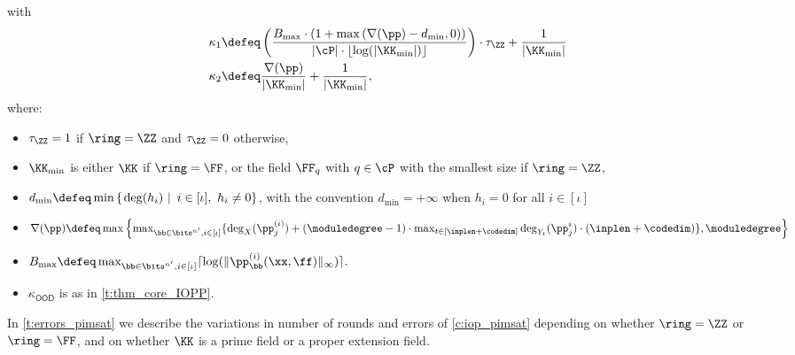 \begin{theorem}
$$    $$
    with 
    \begin{align*}
    \kappa_1 &\defeq  \left(\frac{B_{\max}\cdot \left(1+\max\left(\nabla(\pp) - d_{\min},0\right)\right)}{|\cP|\cdot \lfloor\log(|\KK_{\min}|)\rfloor}\right)\cdot \tau_{\ZZ} + \frac{1}{|\KK_{\min}|} \\
    \kappa_2 &\defeq \frac{\nabla(\pp)}{|\KK_{\min}|} + \frac{1}{|\KK_{\min}|},
    \end{align*}
    where:
    \begin{itemize}
        \item $\tau_{\ZZ}=1$ if $\ring=\ZZ$ and $\tau_\ZZ=0$ otherwise,
        \item $\KK_{\min}$ is either $\KK$ if $\ring=\FF$, or  the field $\FF_q$ with $q\in \cP$ with the smallest size if $\ring=\ZZ$,
        \item $d_{\min} \defeq \min\left\{\left.\deg(h_i) \ \right| \ i\in [\iota], \ h_i\neq 0\right\}$, with the convention $d_{\min}=+\infty$ when $h_i=0$ for all $i\in [\iota]$
        \item $\nabla(\pp)\defeq \max\left\{\max_{\bb\in \bits^{n'}, i\in[\iota]}\{\deg_X(\pp_{j}^{(i)}) + (\moduledegree-1)\cdot \max_{t\in [\inplen+\codedim\textit{}]}\deg_{Y_t}(\pp_j^i)\cdot (\inplen+\codedim)\}, \moduledegree\right\}$
        \item $B_{\max} \defeq \max_{\bb\in \bits^{n'}, i\in [\iota]} \lceil\log(\lVert\pp_{\bb}^{(i)}(\xx,\ff)\rVert_{\infty})\rceil. $
        \item         $\kappa_{\mathsf{OOD}}$ is as in \cref{t:thm_core_IOPP}.
    \end{itemize}
    In \cref{t:errors_pimsat} we describe the variations in number of rounds and errors of \cref{c:iop_pimsat} depending on whether $\ring =\ZZ$ or $\ring=\FF$, and on whether $\KK$ is a prime field or a proper extension field.
\end{theorem}

